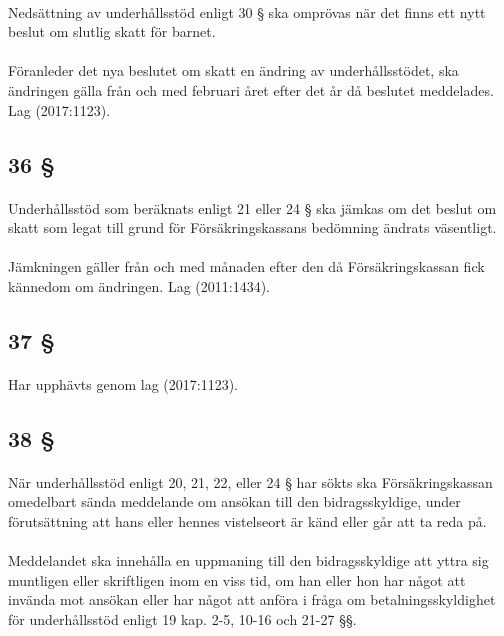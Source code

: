 \documentclass[a4paper,notitlepage,openany,10pt]{book}
\begin{document}
\paragraph*{}
Nedsättning av underhållsstöd enligt 30 § ska omprövas när det finns ett nytt beslut om slutlig skatt för barnet.
\paragraph*{}
Föranleder det nya beslutet om skatt en ändring av underhållsstödet, ska ändringen gälla från och med februari året efter det år då beslutet meddelades.
Lag (2017:1123).
\subsection*{36 §}
\paragraph*{}
Underhållsstöd som beräknats enligt 21 eller 24 § ska jämkas om det beslut om skatt som legat till grund för Försäkringskassans bedömning ändrats väsentligt.
\paragraph*{}
Jämkningen gäller från och med månaden efter den då Försäkringskassan fick kännedom om ändringen.
Lag (2011:1434).
\subsection*{37 §}
\paragraph*{}
Har upphävts genom
lag (2017:1123).
\subsection*{38 §}
\paragraph*{}
När underhållsstöd enligt 20, 21, 22, eller 24 § har sökts ska Försäkringskassan omedelbart sända meddelande om ansökan till den bidragsskyldige, under förutsättning att hans eller hennes vistelseort är känd eller går att ta reda på.
\paragraph*{}
Meddelandet ska innehålla en uppmaning till den bidragsskyldige att yttra sig muntligen eller skriftligen inom en viss tid, om han eller hon har något att invända mot ansökan eller har något att anföra i fråga om betalningsskyldighet för underhållsstöd enligt 19 kap. 2-5, 10-16 och 21-27 §§.
\end{document}
